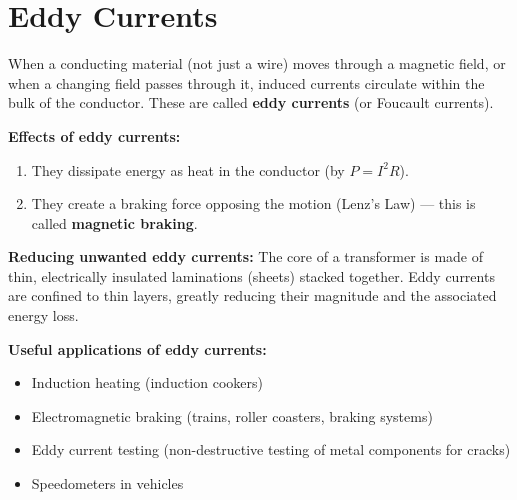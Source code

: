 \section{Eddy Currents}

\begin{definitionbox}
When a conducting material (not just a wire) moves
through a magnetic field, or when a changing field
passes through it, induced currents circulate within
the bulk of the conductor. These are called
\textbf{eddy currents} (or Foucault currents).

\textbf{Effects of eddy currents:}
\begin{enumerate}[noitemsep]
  \item They dissipate energy as heat in the
  conductor (by $P = I^2R$).
  \item They create a braking force opposing the
  motion (Lenz's Law) --- this is called
  \textbf{magnetic braking}.
\end{enumerate}

\textbf{Reducing unwanted eddy currents:}
The core of a transformer is made of thin,
electrically insulated laminations (sheets) stacked
together. Eddy currents are confined to thin layers,
greatly reducing their magnitude and the associated
energy loss.

\textbf{Useful applications of eddy currents:}
\begin{itemize}[noitemsep]
  \item Induction heating (induction cookers)
  \item Electromagnetic braking (trains, roller
  coasters, braking systems)
  \item Eddy current testing (non-destructive
  testing of metal components for cracks)
  \item Speedometers in vehicles
\end{itemize}
\end{definitionbox}


